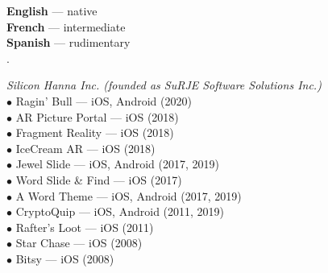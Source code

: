\documentclass[9pt]{developercv}
\begin{document}
\begin{minipage}[t]{0.45\textwidth}
\textbf{English} --- native\\
\textbf{French} --- intermediate\\
\textbf{Spanish} --- rudimentary\\

.
\end{minipage}
\hfill
\begin{minipage}[t]{0.5\textwidth}
\footnotesize{\textit{Silicon Hanna Inc. (founded as SuRJE Software Solutions Inc.)}}\\[4pt]
$\bullet$ Ragin' Bull --- iOS, Android (2020)\\
$\bullet$ AR Picture Portal --- iOS (2018)\\
$\bullet$ Fragment Reality --- iOS (2018)\\
$\bullet$ IceCream AR --- iOS (2018)\\
$\bullet$ Jewel Slide --- iOS, Android (2017, 2019)\\
$\bullet$ Word Slide \& Find --- iOS (2017)\\
$\bullet$ A Word Theme --- iOS, Android (2017, 2019)\\
$\bullet$ CryptoQuip --- iOS, Android (2011, 2019)\\
$\bullet$ Rafter's Loot --- iOS (2011)\\
$\bullet$ Star Chase --- iOS (2008)\\
$\bullet$ Bitsy --- iOS (2008)\\
\end{minipage}
\end{document}
